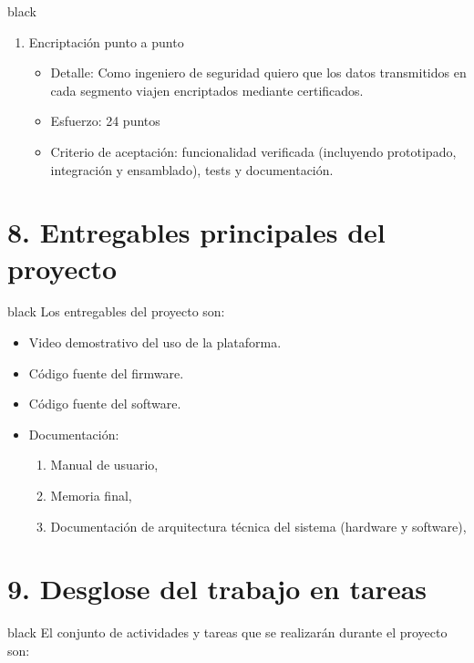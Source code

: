 \documentclass[
11pt, %
]{charter}
\begin{document}
\begin{consigna}{black}
\begin{enumerate}
	\item Encriptación punto a punto
	\begin{itemize}
		\item Detalle: Como ingeniero de seguridad quiero que los datos transmitidos en cada segmento viajen encriptados mediante certificados.
		\item Esfuerzo: 24 puntos
		\item Criterio de aceptación: funcionalidad verificada (incluyendo prototipado, integración y ensamblado), tests y documentación.
	\end{itemize}
	
\end{enumerate}
\end{consigna}



\section{8. Entregables principales del proyecto}
\label{sec:entregables}
\begin{consigna}{black}
Los entregables del proyecto son:
\begin{itemize}
	\item Video demostrativo del uso de la plataforma. 		
	\item Código fuente del firmware.
	\item Código fuente del software.
	\item Documentación:
	\begin{enumerate}				
		\item Manual de usuario,			
		\item Memoria final,
		\item Documentación de arquitectura técnica del sistema (hardware y software),
	\end{enumerate}	
	

\end{itemize}
\end{consigna}

\section{9. Desglose del trabajo en tareas}
\label{sec:wbs}

\begin{consigna}{black}
El conjunto de actividades y tareas que se realizarán durante el proyecto son:


\end{consigna}
\end{document}
